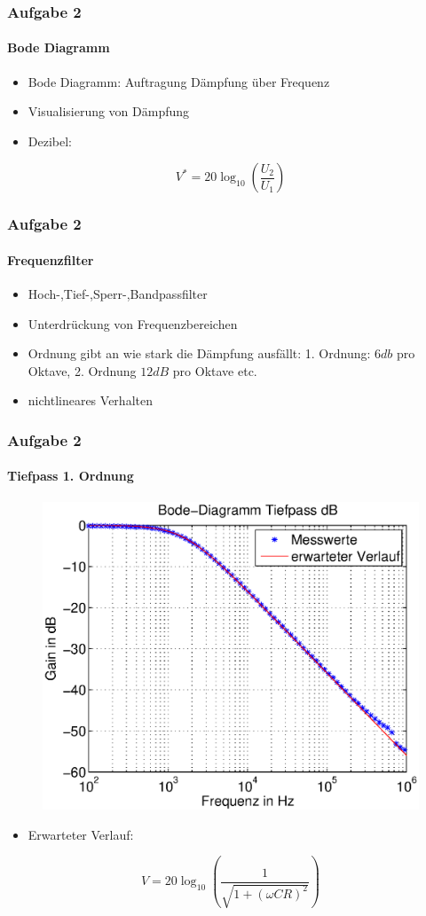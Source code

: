 \begin{frame}
\frametitle{Aufgabe 2}
\framesubtitle{Bode Diagramm}
    \begin{itemize}
        \item Bode Diagramm: Auftragung Dämpfung über Frequenz
        \item Visualisierung von Dämpfung
        \item Dezibel:
    \end{itemize}
    \begin{equation*}
        V^* = 20 \log_{10} \left( \frac{U_2}{U_1} \right) 
    \end{equation*}
\end{frame}
\begin{frame}
\frametitle{Aufgabe 2}
\framesubtitle{Frequenzfilter}
    \begin{itemize}
        \item Hoch-,Tief-,Sperr-,Bandpassfilter
        \item Unterdrückung von Frequenzbereichen
        \item Ordnung gibt an wie stark die Dämpfung ausfällt: 1. Ordnung:
        $6db$ pro Oktave, 2. Ordnung $12dB$ pro Oktave etc.
        \item nichtlineares Verhalten
    \end{itemize}
\end{frame}
\begin{frame}
\frametitle{Aufgabe 2}
\framesubtitle{Tiefpass 1. Ordnung}
\begin{figure}[H]
\begin{center}
        \includegraphics[scale=0.45]{./img/2a_bode_tief_dB.eps}
\end{center}
\end{figure}
\begin{itemize}
    \item Erwarteter Verlauf:
\end{itemize}
    \begin{equation*}
        V = 20 \log_{10} \left( \frac{1}{\sqrt{1+(\omega C R)^2}}\right)
    \end{equation*}
\end{frame}
